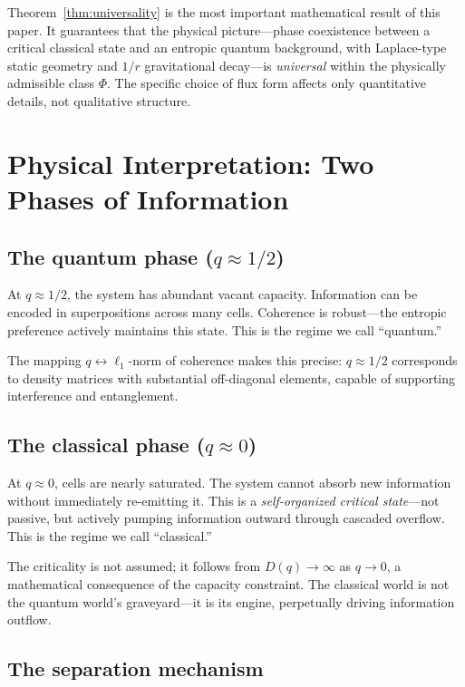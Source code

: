\documentclass[12pt]{article}
\begin{document}
Theorem~\ref{thm:universality} is the most important mathematical result of this paper. It guarantees that the physical picture---phase coexistence between a critical classical state and an entropic quantum background, with Laplace-type static geometry and $1/r$ gravitational decay---is \emph{universal} within the physically admissible class $\Phi$. The specific choice of flux form affects only quantitative details, not qualitative structure.

\section{Physical Interpretation: Two Phases of Information}

\subsection{The quantum phase ($q\approx 1/2$)}

At $q\approx 1/2$, the system has abundant vacant capacity. Information can be encoded in superpositions across many cells. Coherence is robust---the entropic preference actively maintains this state. This is the regime we call ``quantum.''

The mapping $q\leftrightarrow \ell_1$-norm of coherence makes this precise: $q\approx 1/2$ corresponds to density matrices with substantial off-diagonal elements, capable of supporting interference and entanglement.

\subsection{The classical phase ($q\approx 0$)}

At $q\approx 0$, cells are nearly saturated. The system cannot absorb new information without immediately re-emitting it. This is a \emph{self-organized critical state}---not passive, but actively pumping information outward through cascaded overflow. This is the regime we call ``classical.''

The criticality is not assumed; it follows from $D(q)\to\infty$ as $q\to 0$, a mathematical consequence of the capacity constraint. The classical world is not the quantum world's graveyard---it is its engine, perpetually driving information outflow.

\subsection{The separation mechanism}
\end{document}
